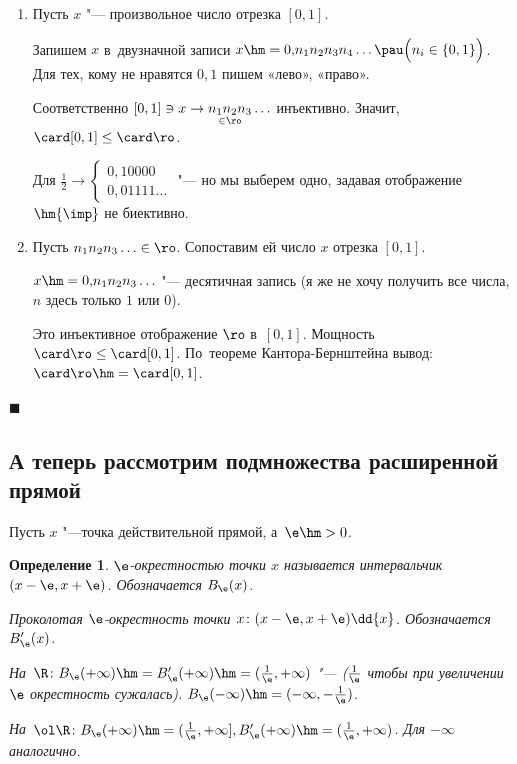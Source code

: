 \documentclass[a4paper,10pt,twoside]{article}
\newtheorem{Def}{Определение}[section]
\newenvironment{Proof}
       {\par\noindent{\textbf{Доказательство.}}}
       {\hfill$\scriptstyle\blacksquare$}
\begin{document}
\begin{Proof}
    \begin{enumerate}
        \item Пусть $x$ "--- произвольное число отрезка $[0,1]$.

            Запишем $x$ в~двузначной записи $x\hm=0{,}n_1n_2n_3n_4\ldots\pau \Big(n_i\in\{0,1\}\Big)$. Для тех, кому не нравятся $0,1$ пишем «лево», «право».



Соответственно $[0,1]\ni x\to \underset{\in\ro}{n_1n_2n_3}\ldots$ инъективно. Значит, $\card [0,1]\leq\card\ro$.

Для $\frac 12\to\begin{cases}
    0{,}10000\\
    0{,}01111\ldots
\end{cases}$ "--- но мы выберем одно, задавая отображение $\hm{\imp}$ не биективно.

\item Пусть $n_1n_2n_3\ldots\in\ro$. Сопоставим ей число $x$ отрезка $[0,1]$.

    $x\hm=0{,}n_1n_2n_3\ldots$ "--- десятичная запись (я же не хочу получить все числа, $n$ здесь только $1$ или $0$).

    Это инъективное отображение $\ro$ в~$[0,1]$. Мощность $\card\ro\leq\card[0,1]$. По~теореме Кантора-Бернштейна вывод: $\card\ro\hm=\card[0,1]$.
    \end{enumerate}
\end{Proof}

\subsection{А теперь рассмотрим подмножества расширенной прямой}

Пусть $x$ "---точка действительной прямой, а~$\e\hm>0$.

\begin{Def}
    $\e$-окрестностью точки $x$ называется интервальчик $(x-\e,x+\e)$. Обозначается $B_\e(x)$.

    Проколотая $\e$-окрестность точки $x\colon(x-\e,x+\e)\dd\{x\}$. Обозначается $B'_\e(x)$.

    На~$\R\colon B_\e(+\infty)\hm=B'_\e(+\infty)\hm=(\frac{1}{\e},+\infty)$ "---
    ($\frac 1\e$ чтобы при увеличении $\e$ окрестность сужалась). $B_\e(-\infty)\hm=(-\infty,-\frac 1\e)$.

    На~$\ol\R\colon B_\e(+\infty)\hm=(\frac{1}{\e},+\infty],B'_\e(+\infty)\hm=(\frac{1}{\e},+\infty)$. Для $-\infty$ аналогично.
\end{Def}
\end{document}
